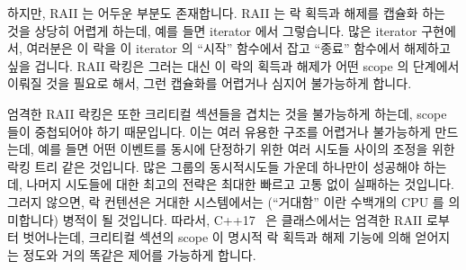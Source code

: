 하지만, RAII 는 어두운 부분도 존재합니다.
RAII 는 락 획득과 해제를 캡슐화 하는 것을 상당히 어렵게 하는데, 예를 들면
iterator 에서 그렇습니다.
많은 iterator 구현에서, 여러분은 이 락을 이 iterator 의 ``시작'' 함수에서 잡고
``종료'' 함수에서 해제하고 싶을 겁니다.
RAII 락킹은 그러는 대신 이 락의 획득과 해제가 어떤 scope 의 단계에서 이뤄질
것을 필요로 해서, 그런 캡슐화를 어렵거나 심지어 불가능하게 합니다.

엄격한 RAII 락킹은 또한 크리티컬 섹션들을 겹치는 것을 불가능하게 하는데, scope
들이 중첩되어야 하기 때문입니다.
이는 여러 유용한 구조를 어렵거나 불가능하게 만드는데, 예를 들면 어떤 이벤트를
동시에 단정하기 위한 여러 시도들 사이의 조정을 위한 락킹 트리 같은 것입니다.
많은 그룹의 동시적시도들 가운데 하나만이 성공해야 하는데, 나머지 시도들에 대한
최고의 전략은 최대한 빠르고 고통 없이 실패하는 것입니다.
그러지 않으면, 락 컨텐션은 거대한 시스템에서는 (``거대함'' 이란 수백개의 CPU 를
의미합니다) 병적이 될 것입니다.
따라서, C++17~\cite{RichardSmith2019N4800} 은  클래스에서는
엄격한 RAII 로부터 벗어나는데, 크리티컬 섹션의 scope 이 명시적 락 획득과 해제
기능에 의해 얻어지는 정도와 거의 똑같은 제어를 가능하게 합니다.

\iffalse


